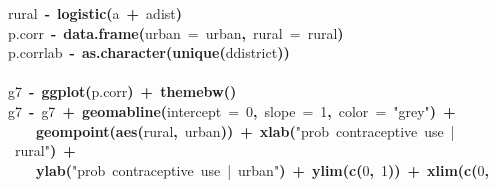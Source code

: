 \documentclass{article}
\makeatletter
\newcommand{\hlnumber}[1]{\textcolor[rgb]{0,0,0}{#1}}%
\newcommand{\hlfunctioncall}[1]{\textcolor[rgb]{.5,0,.33}{\textbf{#1}}}%
\newcommand{\hlstring}[1]{\textcolor[rgb]{.6,.6,1}{#1}}%
\newcommand{\hlkeyword}[1]{\textbf{#1}}%
\newcommand{\hlargument}[1]{\textcolor[rgb]{.69,.25,.02}{#1}}%
\newcommand{\hlassignement}[1]{\textbf{#1}}%
\newcommand{\hlsymbol}[1]{#1}%
\newcommand{\hlstd}[1]{\textcolor[rgb]{0,0,0}{#1}}%
\newenvironment{kframe}{%
 \def\FrameCommand##1{\hskip\@totalleftmargin \hskip-\fboxsep
 \colorbox{shadecolor}{##1}\hskip-\fboxsep
     \hskip-\linewidth \hskip-\@totalleftmargin \hskip\columnwidth}%
 \MakeFramed {\advance\hsize-\width
   \@totalleftmargin\z@ \linewidth\hsize
   \@setminipage}}%
 {\par\unskip\endMakeFramed}
\newenvironment{knitrout}{}{} %
\makeatother
\begin{document}
\begin{knitrout}
{\begin{kframe}
\begin{flushleft}
\hlstd{}\hlsymbol{rural}{\ }\hlassignement{\usebox{\hlnormalsizeboxlessthan}-}{\ }\hlfunctioncall{logistic}\hlkeyword{(}\hlsymbol{a}{\ }\hlkeyword{+}{\ }\hlsymbol{a\usebox{\hlnormalsizeboxunderscore}dist}\hlkeyword{)}\hspace*{\fill}\\
\hlstd{}\hlsymbol{p.corr}{\ }\hlassignement{\usebox{\hlnormalsizeboxlessthan}-}{\ }\hlfunctioncall{data.frame}\hlkeyword{(}\hlargument{urban}{\ }\hlargument{=}{\ }\hlsymbol{urban}\hlkeyword{,}{\ }\hlargument{rural}{\ }\hlargument{=}{\ }\hlsymbol{rural}\hlkeyword{)}\hspace*{\fill}\\
\hlstd{}\hlsymbol{p.corr}\hlkeyword{\usebox{\hlnormalsizeboxdollar}}\hlsymbol{lab}{\ }\hlassignement{\usebox{\hlnormalsizeboxlessthan}-}{\ }\hlfunctioncall{as.character}\hlkeyword{(}\hlfunctioncall{unique}\hlkeyword{(}\hlsymbol{d}\hlkeyword{\usebox{\hlnormalsizeboxdollar}}\hlsymbol{district}\hlkeyword{)}\hlkeyword{)}\hspace*{\fill}\\
\hlstd{}\hspace*{\fill}\\
\hlstd{}\hlsymbol{g7}{\ }\hlassignement{\usebox{\hlnormalsizeboxlessthan}-}{\ }\hlfunctioncall{ggplot}\hlkeyword{(}\hlsymbol{p.corr}\hlkeyword{)}{\ }\hlkeyword{+}{\ }\hlfunctioncall{theme\usebox{\hlnormalsizeboxunderscore}bw}\hlkeyword{(}\hlkeyword{)}\hspace*{\fill}\\
\hlstd{}\hlsymbol{g7}{\ }\hlassignement{\usebox{\hlnormalsizeboxlessthan}-}{\ }\hlsymbol{g7}{\ }\hlkeyword{+}{\ }\hlfunctioncall{geom\usebox{\hlnormalsizeboxunderscore}abline}\hlkeyword{(}\hlargument{intercept}{\ }\hlargument{=}{\ }\hlnumber{0}\hlkeyword{,}{\ }\hlargument{slope}{\ }\hlargument{=}{\ }\hlnumber{1}\hlkeyword{,}{\ }\hlargument{color}{\ }\hlargument{=}{\ }\hlstring{"grey"}\hlkeyword{)}{\ }\hlkeyword{+}\hspace*{\fill}\\
\hlstd{}{\ }{\ }{\ }{\ }\hlfunctioncall{geom\usebox{\hlnormalsizeboxunderscore}point}\hlkeyword{(}\hlfunctioncall{aes}\hlkeyword{(}\hlsymbol{rural}\hlkeyword{,}{\ }\hlsymbol{urban}\hlkeyword{)}\hlkeyword{)}{\ }\hlkeyword{+}{\ }\hlfunctioncall{xlab}\hlkeyword{(}\hlstring{"prob{\ }contraceptive{\ }use{\ }|{\ }rural"}\hlkeyword{)}{\ }\hlkeyword{+}\hspace*{\fill}\\
\hlstd{}{\ }{\ }{\ }{\ }\hlfunctioncall{ylab}\hlkeyword{(}\hlstring{"prob{\ }contraceptive{\ }use{\ }|{\ }urban"}\hlkeyword{)}{\ }\hlkeyword{+}{\ }\hlfunctioncall{ylim}\hlkeyword{(}\hlfunctioncall{c}\hlkeyword{(}\hlnumber{0}\hlkeyword{,}{\ }\hlnumber{1}\hlkeyword{)}\hlkeyword{)}{\ }\hlkeyword{+}{\ }\hlfunctioncall{xlim}\hlkeyword{(}\hlfunctioncall{c}\hlkeyword{(}\hlnumber{0}\hlkeyword{,}\hspace*{\fill}\\

\end{flushleft}
\end{kframe}}
\end{knitrout}
\end{document}
